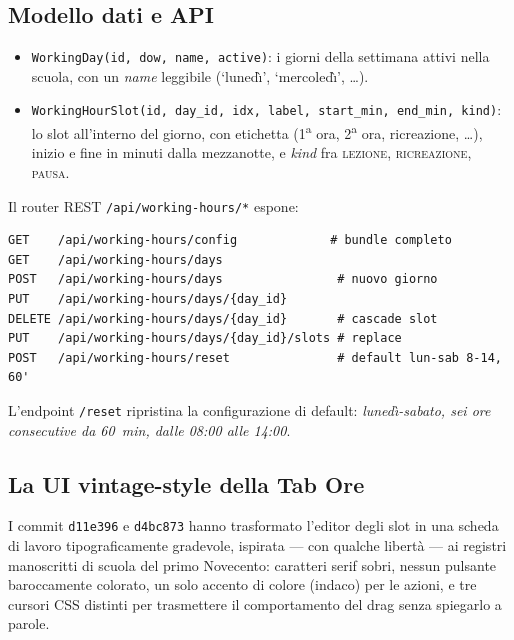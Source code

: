 \subsection{Modello dati e API}

\begin{itemize}
  \item \texttt{WorkingDay(id, dow, name, active)}: i giorni
    della settimana attivi nella scuola, con un \emph{name}
    leggibile (`luned\`{\i}', `mercoled\`{\i}', \dots).
  \item \texttt{WorkingHourSlot(id, day\_id, idx, label,
    start\_min, end\_min, kind)}: lo slot all'interno del giorno,
    con etichetta (1\textsuperscript{a} ora, 2\textsuperscript{a}
    ora, ricreazione, \dots), inizio e fine in minuti dalla
    mezzanotte, e \emph{kind} fra \textsc{lezione},
    \textsc{ricreazione}, \textsc{pausa}.
\end{itemize}

Il router REST \texttt{/api/working-hours/*} espone:
\begin{lstlisting}[basicstyle=\ttfamily\footnotesize]
GET    /api/working-hours/config             # bundle completo
GET    /api/working-hours/days
POST   /api/working-hours/days                # nuovo giorno
PUT    /api/working-hours/days/{day_id}
DELETE /api/working-hours/days/{day_id}       # cascade slot
PUT    /api/working-hours/days/{day_id}/slots # replace
POST   /api/working-hours/reset               # default lun-sab 8-14, 60'
\end{lstlisting}

L'endpoint \texttt{/reset} ripristina la configurazione di
default: \emph{luned\`{\i}-sabato, sei ore consecutive da
\SI{60}{\minute}, dalle 08:00 alle 14:00}.

\subsection{La UI vintage-style della Tab Ore}
\label{sec:ore-vintage}

I commit \texttt{d11e396} e \texttt{d4bc873} hanno trasformato
l'editor degli slot in una scheda di lavoro tipograficamente
gradevole, ispirata --- con qualche libert\`a --- ai registri
manoscritti di scuola del primo Novecento: caratteri serif sobri,
nessun pulsante baroccamente colorato, un solo accento di colore
(indaco) per le azioni, e tre cursori CSS distinti per
trasmettere il comportamento del drag senza spiegarlo a parole.

